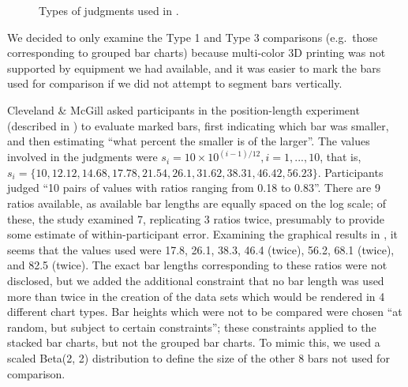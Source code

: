 \documentclass[runningheads
]{llncs}
\begin{document}
\begin{figure}


\caption{\label{fig-cm-types}Types of judgments used in
\textcite{clevelandGraphicalPerceptionTheory1984}.}

\end{figure}%

We decided to only examine the Type 1 and Type 3 comparisons (e.g.~those
corresponding to grouped bar charts) because multi-color 3D printing was
not supported by equipment we had available, and it was easier to mark
the bars used for comparison if we did not attempt to segment bars
vertically.

Cleveland \& McGill asked participants in the position-length experiment
(described in \autocite{clevelandGraphicalPerceptionTheory1984}) to
evaluate marked bars, first indicating which bar was smaller, and then
estimating ``what percent the smaller is of the larger''. The values
involved in the judgments were
\(s_i = 10 \times 10^{(i-1)/12}, i = 1, ..., 10\), that is,
\(s_i =\{10, 12.12, 14.68, 17.78, 21.54, 26.1, 31.62, 38.31, 46.42, 56.23\}\).
Participants judged ``10 pairs of values with ratios ranging from 0.18
to 0.83''. There are 9 ratios available, as available bar lengths are
equally spaced on the log scale; of these, the study examined 7,
replicating 3 ratios twice, presumably to provide some estimate of
within-participant error. Examining the graphical results in
\textcite{clevelandGraphicalPerceptionTheory1984}, it seems that the
values used were 17.8, 26.1, 38.3, 46.4 (twice), 56.2, 68.1 (twice), and
82.5 (twice). The exact bar lengths corresponding to these ratios were
not disclosed, but we added the additional constraint that no bar length
was used more than twice in the creation of the data sets which would be
rendered in 4 different chart types. Bar heights which were not to be
compared were chosen ``at random, but subject to certain constraints'';
these constraints applied to the stacked bar charts, but not the grouped
bar charts. To mimic this, we used a scaled Beta(2, 2) distribution to
define the size of the other 8 bars not used for comparison.
\end{document}
